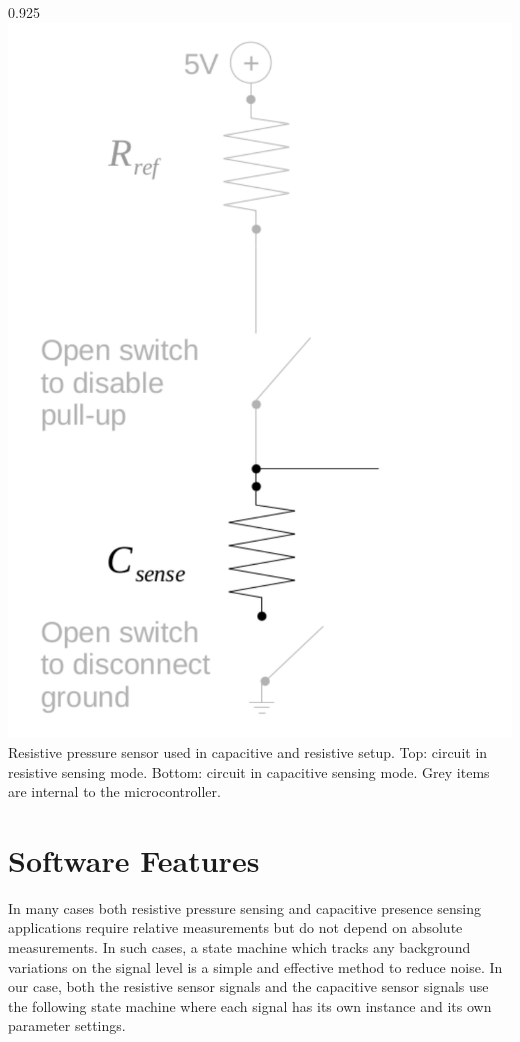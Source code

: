 \documentclass{sigchi-ext}
\begin{document}
{{\begin{0.9\marginpagewidth}{0.925\marginparwidth}
{      \includegraphics[width=0.85\marginparwidth]{figures/cap_res_setup_cap}
      Resistive pressure sensor used in capacitive and resistive setup. Top: circuit in
      resistive sensing mode. Bottom: circuit in capacitive sensing mode. Grey items are internal to the
      microcontroller.
    }
    \end{0.9\marginpagewidth}
  }
}
\normalmarginpar
\vspace{60pt}

\section{Software Features}
In many cases both resistive pressure sensing and capacitive presence sensing
applications require relative measurements but do not depend on absolute
measurements. In such cases, a state machine which tracks any background
variations on the signal level is a simple and effective method to reduce noise.
In our case, both the resistive sensor signals and the capacitive sensor signals
use the following state machine where each signal has its own instance and
its own parameter settings.
\end{document}
